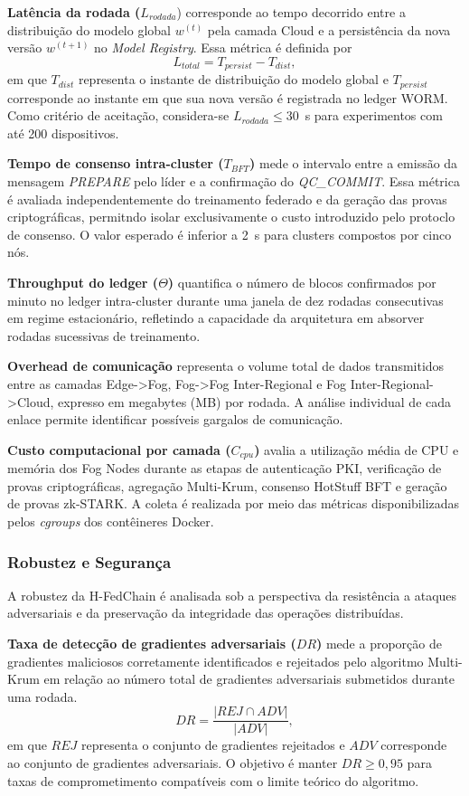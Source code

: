 \documentclass[12pt]{article}
\begin{document}
\textbf{Latência da rodada ($L_{rodada}$}) corresponde ao tempo decorrido entre a distribuição do modelo global $w^{(t)}$ pela camada Cloud e a persistência da nova versão $w^{(t+1)}$ no \textit{Model Registry}. Essa métrica é definida por 
\[
L_{total} = T_{persist} - T_{dist},
\]
em que $T_{dist}$ representa o instante de distribuição do modelo global e $T_{persist}$ corresponde ao instante em que sua nova versão é registrada no ledger WORM. Como critério de aceitação, considera-se $L_{rodada} \leq 30$~s para experimentos com até 200 dispositivos.

\textbf{Tempo de consenso intra-cluster ($T_{BFT}$)} mede o intervalo entre a emissão da mensagem \textit{PREPARE} pelo líder e a confirmação do \textit{QC\_COMMIT}. Essa métrica é avaliada independentemente do treinamento federado e da geração das provas criptográficas, permitndo isolar exclusivamente o custo introduzido pelo protoclo de consenso. O valor esperado é inferior a 2~s para clusters compostos por cinco nós.

\textbf{Throughput do ledger ($\Theta$)} quantifica o número de blocos confirmados por minuto no ledger intra-cluster durante uma janela de dez rodadas consecutivas em regime estacionário, refletindo a capacidade da arquitetura em absorver rodadas sucessivas de treinamento.

\textbf{Overhead de comunicação} representa o volume total de dados transmitidos entre as camadas Edge->Fog, Fog->Fog Inter-Regional e Fog Inter-Regional->Cloud, expresso em megabytes (MB) por rodada. A análise individual de cada enlace permite identificar possíveis gargalos de comunicação.

\textbf{Custo computacional por camada ($C_{cpu}$)} avalia a utilização média de CPU e memória dos Fog Nodes durante as etapas de autenticação PKI, verificação de provas criptográficas, agregação Multi-Krum, consenso HotStuff BFT e geração de provas zk-STARK. A coleta é realizada por meio das métricas disponibilizadas pelos \textit{cgroups} dos contêineres Docker.

\subsubsection{Robustez e Segurança}

A robustez da H-FedChain é analisada sob a perspectiva da resistência a ataques adversariais e da preservação da integridade das operações distribuídas.

\textbf{Taxa de detecção de gradientes adversariais ($DR$)} mede a proporção de gradientes maliciosos corretamente identificados e rejeitados pelo algoritmo Multi-Krum em relação ao número total de gradientes adversariais submetidos durante uma rodada.
\[
DR=\frac{|{REJ}\cap{ADV}|}{|{ADV}|},
\]
em que ${REJ}$ representa o conjunto de gradientes rejeitados e ${ADV}$ corresponde ao conjunto de gradientes adversariais. O objetivo é manter $DR \geq 0,95$ para taxas de comprometimento compatíveis com o limite teórico do algoritmo.
\end{document}
